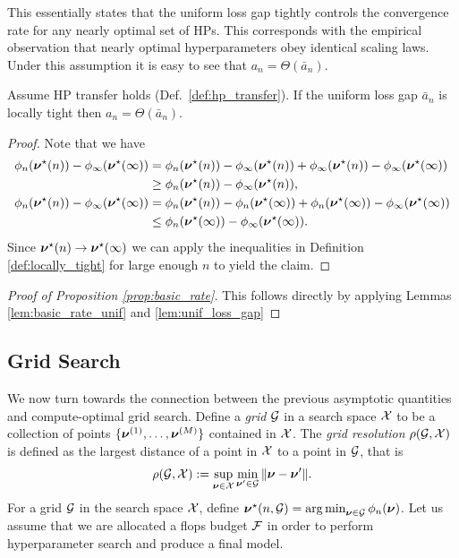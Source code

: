 This essentially states that the uniform loss gap tightly controls the convergence rate for any nearly optimal set of HPs. This corresponds with the empirical observation that nearly optimal hyperparameters obey identical scaling laws. Under this assumption it is easy to see that $a_n = \Theta(\bar{a}_n).$ 
\begin{lemma}\label{lem:unif_loss_gap}
    Assume HP transfer holds (Def.\ \ref{def:hp_transfer}). If the uniform loss gap $\bar{a}_n$ is locally tight then $a_n = \Theta(\bar{a}_n)$.
\end{lemma}
\begin{proof}
    Note that we have
    \begin{align*}
        \phi_n(\bm{\nu}^\star(n)) - \phi_\infty(\bm{\nu}^\star(\infty)) &= \phi_n(\bm{\nu}^\star(n)) - \phi_\infty(\bm{\nu}^\star(n)) + \phi_\infty(\bm{\nu}^\star(n)) - \phi_\infty(\bm{\nu}^\star(\infty))\\
        &\geq \phi_n(\bm{\nu}^\star(n)) - \phi_\infty(\bm{\nu}^\star(n)),\\
        \phi_n(\bm{\nu}^\star(n)) - \phi_\infty(\bm{\nu}^\star(\infty)) &= \phi_n(\bm{\nu}^\star(n)) - \phi_n(\bm{\nu}^\star(\infty)) + \phi_n(\bm{\nu}^\star(\infty)) - \phi_\infty(\bm{\nu}^\star(\infty))\\
        &\leq \phi_n(\bm{\nu}^\star(\infty)) - \phi_\infty(\bm{\nu}^\star(\infty)).
    \end{align*}
    Since $\bm{\nu}^\star(n) \to \bm{\nu}^\star(\infty)$ we can apply the inequalities in Definition \ref{def:locally_tight} for large enough $n$ to yield the claim.
\end{proof}
\begin{proof}[Proof of Proposition \ref{prop:basic_rate}]
    This follows directly by applying Lemmas \ref{lem:basic_rate_unif} and \ref{lem:unif_loss_gap}
\end{proof}


\subsection{Grid Search}\label{app:grid_search}
We now turn towards the connection between the previous asymptotic quantities and compute-optimal grid search. Define a \emph{grid} $\mathcal{G}$ in a search space $\mathcal{X}$ to be a collection of points $\{\bm{\nu}^{(1)}, \ldots, \bm{\nu}^{(M)}\}$ contained in $\mathcal{X}$. The \emph{grid resolution} $\rho(\mathcal{G}, \mathcal{X})$ is defined as the largest distance of a point in $\mathcal{X}$ to a point in $\mathcal{G}$, that is
\[
    \rho(\mathcal{G}, \mathcal{X}) := \sup_{\bm{\nu} \in \mathcal{X}} \min_{\bm{\nu}' \in \mathcal{G}} \norm{\bm{\nu} - \bm{\nu}'}.
\]
For a grid $\mathcal{G}$ in the search space $\mathcal{X}$, define $\bm{\nu}^\star(n, \mathcal{G}) = \operatorname*{arg\,min}_{\bm{\nu} \in \mathcal{G}} \phi_n(\bm{\nu})$. Let us assume that we are allocated a flops budget $\mathcal{F}$ in order to perform hyperparameter search and produce a final model.  


